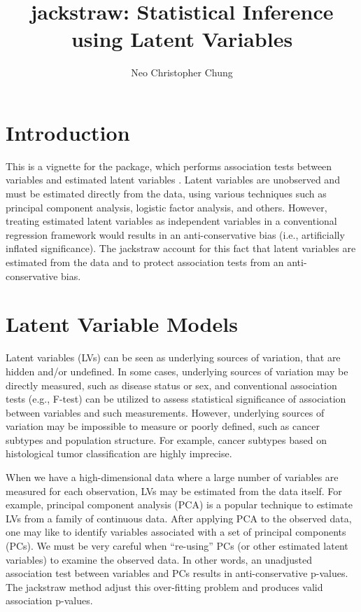 \documentclass{article}\usepackage[]{graphicx}\usepackage[]{color}
\title{jackstraw: Statistical Inference using Latent Variables}
\author{Neo Christopher Chung}
\begin{document}
\maketitle

\section{Introduction}

This is a vignette for the \verb@jackstraw@ package, which performs association tests between variables and estimated latent variables \cite{jackstraw}. Latent variables are unobserved and must be estimated directly from the data, using various techniques such as principal component analysis, logistic factor analysis, and others. However, treating estimated latent variables as independent variables in a conventional regression framework would results in an anti-conservative bias (i.e., artificially inflated significance). The jackstraw account for this fact that latent variables are estimated from the data and to protect association tests from an anti-conservative bias.

\section{Latent Variable Models}

Latent variables (LVs) can be seen as underlying sources of variation, that are hidden and/or undefined. In some cases, underlying sources of variation may be directly measured, such as disease status or sex, and conventional association tests (e.g., F-test) can be utilized to assess statistical significance of association between variables and such measurements. However, underlying sources of variation may be impossible to measure or poorly defined, such as cancer subtypes and population structure. For example, cancer subtypes based on histological tumor classification are highly imprecise.

When we have a high-dimensional data where a large number of variables are measured for each observation, LVs may be estimated from the data itself. For example, principal component analysis (PCA) is a popular technique to estimate LVs from a family of continuous data. After applying PCA to the observed data, one may like to identify variables associated with a set of principal components (PCs). We must be very careful when ``re-using'' PCs (or other estimated latent variables) to examine the observed data. In other words, an unadjusted association test between variables and PCs results in anti-conservative p-values. The jackstraw method adjust this over-fitting problem and produces valid association p-values.
\end{document}
